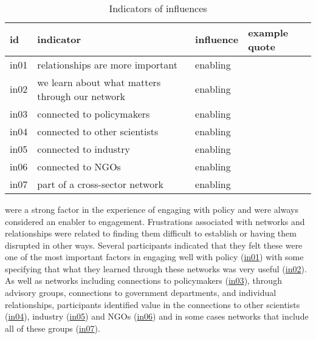 \subsubsection{\titnetw}\label{sec:resskinetw}

\begin{table}[!ht]
\footnotesize
\caption{Indicators of \skinetw{} influences}\label{tab:resskinetw}
\begin{tabular}{L{.07\linewidth}L{.3\linewidth}L{.11\linewidth}L{.52\linewidth}} \hline
\textbf{id} & \textbf{indicator} & \textbf{influence} & \textbf{example quote} \\ \hline \hline 
in01 & relationships are more important & enabling &  \\[5mm]
in02 & we learn about what matters through our network & enabling &  \\[5mm]
in03 & connected to policymakers & enabling &  \\[5mm]
in04 & connected to other scientists & enabling &  \\[5mm]
in05 & connected to industry & enabling &  \\[5mm]
in06 & connected to NGOs & enabling &  \\[5mm]
in07 & part of a cross-sector network & enabling &  \\[5mm]
\hline
\end{tabular}
\end{table}

\skinetw{} were a strong factor in the experience of engaging with policy and were always considered an enabler to engagement. Frustrations associated with networks and relationships were related to finding them difficult to establish or having them disrupted in other ways. Several participants indicated that they felt these were one of the most important factors in engaging well with policy (\hyperref[tab:resskinetw]{in01}) with some specifying that what they learned through these networks was very useful (\hyperref[tab:resskinetw]{in02}). As well as networks including connections to policymakers (\hyperref[tab:resskinetw]{in03}), through advisory groups, connections to government departments, and individual relationships, participants identified value in the connections to other scientists (\hyperref[tab:resskinetw]{in04}), industry (\hyperref[tab:resskinetw]{in05}) and NGOs (\hyperref[tab:resskinetw]{in06}) and in some cases networks that include all of these groups (\hyperref[tab:resskinetw]{in07}).

